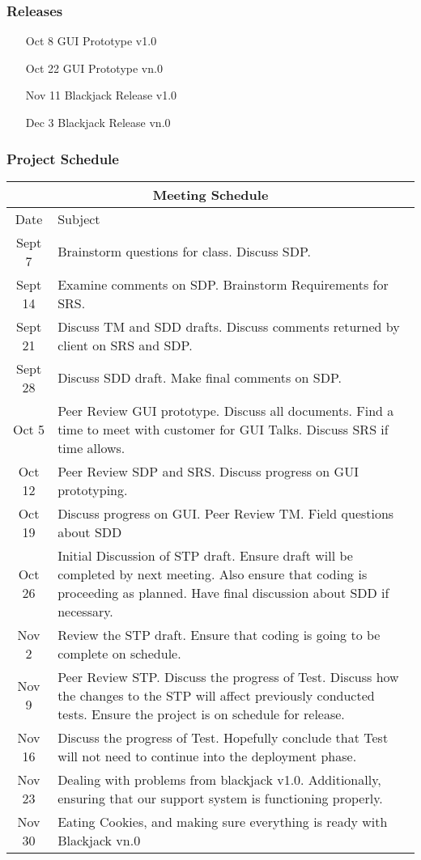 \documentclass{article}
\begin{document}
\subsubsection{Releases}
\begin{itemize}
\item[Oct 8] GUI Prototype v1.0
\item[Oct 22] GUI Prototype vn.0
\item[Nov 11] Blackjack Release v1.0
\item[Dec 3] Blackjack Release vn.0
\end{itemize}
\subsubsection{Project Schedule}
\begin{tabular}{|c|p{5in}|}
\hline
\multicolumn{2}{|c|}{ Meeting Schedule}\\\hline
Date & Subject \\\hline
Sept 7 & Brainstorm questions for class.  Discuss SDP. \\\hline
Sept 14 &  Examine comments on SDP.  Brainstorm Requirements for SRS.\\\hline
Sept 21 &  Discuss TM and SDD drafts.  Discuss comments returned by client on SRS and SDP.\\\hline
Sept 28& Discuss SDD draft.  Make final comments on SDP. \\\hline
Oct 5& Peer Review GUI prototype.  Discuss all documents. Find a time to meet with customer for GUI Talks.  Discuss SRS if time allows.\\\hline
Oct 12&  Peer Review SDP and SRS.  Discuss progress on GUI prototyping.\\\hline
Oct 19&  Discuss progress on GUI.  Peer Review TM.  Field questions about SDD  \\\hline
Oct 26& Initial Discussion of STP draft.  Ensure draft will be completed by next meeting.  Also ensure that coding is proceeding as planned.  Have final discussion about SDD if necessary. \\\hline
Nov 2& Review the STP draft.  Ensure that coding is going to be complete on schedule. \\\hline
Nov 9& Peer Review STP.  Discuss the progress of Test.  Discuss how the changes to the STP will affect previously conducted tests.  Ensure the project is on schedule for release. \\\hline
Nov 16& Discuss the progress of Test.  Hopefully conclude that Test will not need to continue into the deployment phase. \\\hline
Nov 23& Dealing with problems from blackjack v1.0.  Additionally, ensuring that our support system is functioning properly.  \\\hline
Nov 30& Eating Cookies, and making sure everything is ready with Blackjack vn.0 \\\hline
\end{tabular}
\end{document}
